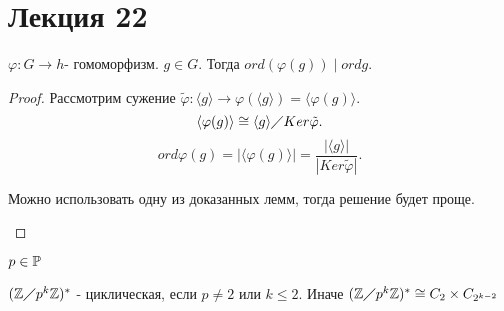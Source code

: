 \documentclass[12pt]{report}
\begin{document}
\section{Лекция 22}
\begin{st}
$\varphi: G \to  h $- гомоморфизм. $g \in  G$.
Тогда $ord(\varphi(g)) \mid ord g $.
\end{st}
\begin{proof}
    Рассмотрим  сужение $\tilde \varphi: \langle g \rangle \to  \varphi (\langle g \rangle) = \langle \varphi(g) \rangle$. \[
	\langle \varphi(g) \rangle \cong \langle g \rangle \diagup Ker \tilde \varphi
    .\] 
    \[
	ord \varphi (g) = |\langle \varphi (g) \rangle| = \frac{|\langle g \rangle|}{| Ker \tilde \varphi|}
    .\] 
    \begin{note}
        Можно использовать одну из доказанных лемм, тогда решение будет проще.
    \end{note}
\end{proof}
\begin{thm}$p \in  \mathbb{P}$

    $(\mathbb{Z} \diagup p^k \mathbb{Z})^{*}$ - циклическая, если $p \ne 2$ или $k \le  2$. Иначе
    $(\mathbb{Z} \diagup p^k \mathbb{Z})^{*} \cong C_2 \times C_{2^{k-2}}$ 
\end{thm}
\end{document}
